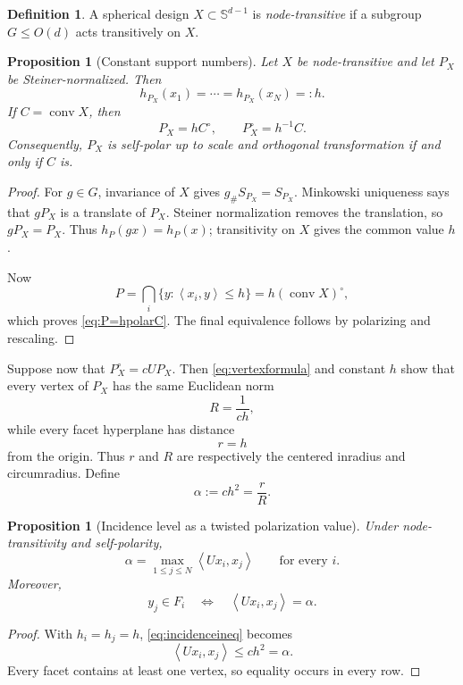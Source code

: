 \documentclass[11pt]{amsart}
\newtheorem{proposition}[theorem]{Proposition}
\theoremstyle{definition}
\newtheorem{definition}[theorem]{Definition}
\theoremstyle{remark}
\newcommand{\Sph}{\mathbb S}
\newcommand{\conv}{\operatorname{conv}}
\newcommand{\ip}[2]{\left\langle #1,#2\right\rangle}
\begin{document}
\begin{definition}
A spherical design $X\subset\Sph^{d-1}$ is \emph{node-transitive} if a subgroup $G\le O(d)$ acts transitively on $X$.
\end{definition}

\begin{proposition}[Constant support numbers]\label{prop:constant-h}
Let $X$ be node-transitive and let $P_X$ be Steiner-normalized.  Then
\[
 h_{P_X}(x_1)=\cdots=h_{P_X}(x_N)=:h.
\]
If $C=\conv X$, then
\begin{equation}\label{eq:P=hpolarC}
 \boxed{P_X=hC^\circ,\qquad P_X^\circ=h^{-1}C.}
\end{equation}
Consequently, $P_X$ is self-polar up to scale and orthogonal transformation if and only if $C$ is.
\end{proposition}

\begin{proof}
For $g\in G$, invariance of $X$ gives $g_\#S_{P_X}=S_{P_X}$.  Minkowski uniqueness says that $gP_X$ is a translate of $P_X$.  Steiner normalization removes the translation, so $gP_X=P_X$.  Thus $h_P(gx)=h_P(x)$; transitivity on $X$ gives the common value $h$.

Now
\[
 P=\bigcap_i\{y:\ip{x_i}{y}\le h\}
 =h\left(\conv X\right)^\circ,
\]
which proves \eqref{eq:P=hpolarC}.  The final equivalence follows by polarizing and rescaling.  \qedhere
\end{proof}

Suppose now that $P_X^\circ=cUP_X$.  Then \eqref{eq:vertexformula} and constant $h$ show that every vertex of $P_X$ has the same Euclidean norm
\[
 R=\frac1{ch},
\]
while every facet hyperplane has distance
\[
 r=h
\]
from the origin.  Thus $r$ and $R$ are respectively the centered inradius and circumradius.  Define
\begin{equation}\label{eq:alpha}
 \alpha:=ch^2=\frac rR.
\end{equation}

\begin{proposition}[Incidence level as a twisted polarization value]\label{prop:alpha}
Under node-transitivity and self-polarity,
\begin{equation}\label{eq:maxrow}
 \boxed{\alpha=\max_{1\le j\le N}\ip{Ux_i}{x_j}}
 \qquad\text{for every }i.
\end{equation}
Moreover,
\[
 y_j\in F_i
 \quad\Longleftrightarrow\quad
 \ip{Ux_i}{x_j}=\alpha.
\]
\end{proposition}

\begin{proof}
With $h_i=h_j=h$, \eqref{eq:incidenceineq} becomes
\[
 \ip{Ux_i}{x_j}\le ch^2=\alpha.
\]
Every facet contains at least one vertex, so equality occurs in every row.  \qedhere
\end{proof}
\end{document}
